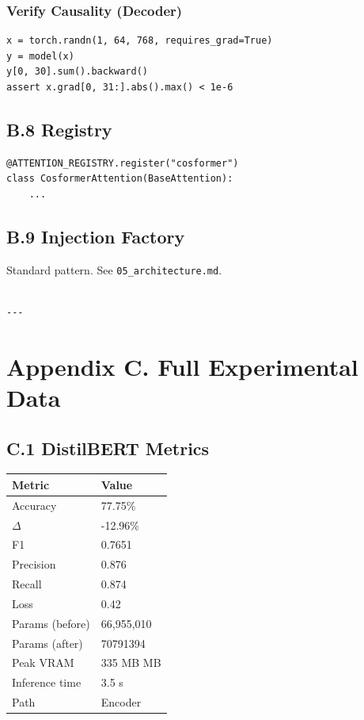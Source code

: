 \subsubsection{Verify Causality (Decoder)}

\begin{lstlisting}
x = torch.randn(1, 64, 768, requires_grad=True)
y = model(x)
y[0, 30].sum().backward()
assert x.grad[0, 31:].abs().max() < 1e-6
\end{lstlisting}

\subsection{B.8 Registry}

\begin{lstlisting}
@ATTENTION_REGISTRY.register("cosformer")
class CosformerAttention(BaseAttention):
    ...
\end{lstlisting}

\subsection{B.9 Injection Factory}

Standard pattern. See \texttt{05\_architecture.md}.
\begin{lstlisting}

---
\end{lstlisting}


\section{Appendix C. Full Experimental Data}

\subsection{C.1 DistilBERT Metrics}

\begin{table}[H]
\centering
\small
\begin{tabular}{ll}
\toprule
\textbf{Metric} & \textbf{Value} \\
\midrule
Accuracy & 77.75\% \\
$\Delta$ & -12.96\% \\
F1 & 0.7651 \\
Precision & 0.876 \\
Recall & 0.874 \\
Loss & 0.42 \\
Params (before) & 66,955,010 \\
Params (after) & 70791394 \\
Peak VRAM & 335 MB MB \\
Inference time & 3.5 s \\
Path & Encoder \\
\bottomrule
\end{tabular}
\end{table}

